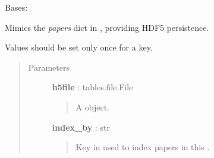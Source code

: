 \documentclass[letterpaper,10pt,english]{sphinxmanual}
\begin{document}
\begin{fulllineitems}
\label{tethne.persistence.hdf5.util:tethne.persistence.hdf5.util.papers_table}
Bases: 

Mimics the \emph{papers} dict in {\hyperref[tethne.classes.paper:tethne.classes.paper.Paper]{}}, providing HDF5 persistence.

Values should be set only once for a key.
\begin{quote}\begin{description}
\item[{Parameters}] \leavevmode
\textbf{h5file} : tables.file.File
\begin{quote}

A  object.
\end{quote}

\textbf{index\_by} : str
\begin{quote}

Key in {\hyperref[tethne.classes.paper:tethne.classes.paper.Paper]{}} used to index papers in this 
{\hyperref[tethne.classes.corpus:tethne.classes.corpus.Corpus]{}}.
\end{quote}

\end{description}\end{quote}

\begin{fulllineitems}
\label{tethne.persistence.hdf5.util:tethne.persistence.hdf5.util.papers_table.iteritems}
\end{fulllineitems}


\begin{fulllineitems}
\label{tethne.persistence.hdf5.util:tethne.persistence.hdf5.util.papers_table.keys}
\end{fulllineitems}


\begin{fulllineitems}
\label{tethne.persistence.hdf5.util:tethne.persistence.hdf5.util.papers_table.values}
\end{fulllineitems}


\end{fulllineitems}
\end{document}
